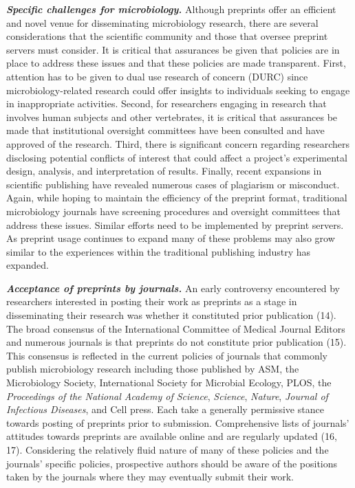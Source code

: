 \documentclass[11,]{article}
\begin{document}
\textbf{\emph{Specific challenges for microbiology.}} Although preprints
offer an efficient and novel venue for disseminating microbiology
research, there are several considerations that the scientific community
and those that oversee preprint servers must consider. It is critical
that assurances be given that policies are in place to address these
issues and that these policies are made transparent. First, attention
has to be given to dual use research of concern (DURC) since
microbiology-related research could offer insights to individuals
seeking to engage in inappropriate activities. Second, for researchers
engaging in research that involves human subjects and other vertebrates,
it is critical that assurances be made that institutional oversight
committees have been consulted and have approved of the research. Third,
there is significant concern regarding researchers disclosing potential
conflicts of interest that could affect a project's experimental design,
analysis, and interpretation of results. Finally, recent expansions in
scientific publishing have revealed numerous cases of plagiarism or
misconduct. Again, while hoping to maintain the efficiency of the
preprint format, traditional microbiology journals have screening
procedures and oversight committees that address these issues. Similar
efforts need to be implemented by preprint servers. As preprint usage
continues to expand many of these problems may also grow similar to the
experiences within the traditional publishing industry has expanded.

\textbf{\emph{Acceptance of preprints by journals.}} An early
controversy encountered by researchers interested in posting their work
as preprints as a stage in disseminating their research was whether it
constituted prior publication (14). The broad consensus of the
International Committee of Medical Journal Editors and numerous journals
is that preprints do not constitute prior publication (15). This
consensus is reflected in the current policies of journals that commonly
publish microbiology research including those published by ASM, the
Microbiology Society, International Society for Microbial Ecology, PLOS,
the \emph{Proceedings of the National Academy of Science},
\emph{Science}, \emph{Nature}, \emph{Journal of Infectious Diseases},
and Cell press. Each take a generally permissive stance towards posting
of preprints prior to submission. Comprehensive lists of journals'
attitudes towards preprints are available online and are regularly
updated (16, 17). Considering the relatively fluid nature of many of
these policies and the journals' specific policies, prospective authors
should be aware of the positions taken by the journals where they may
eventually submit their work.
\end{document}
